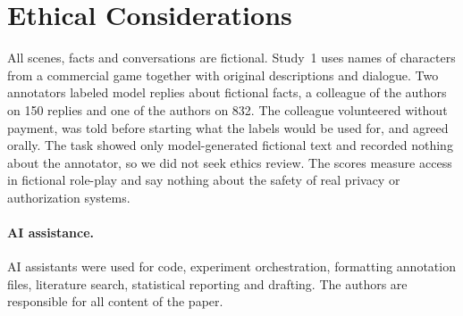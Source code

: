 \documentclass[11pt]{article}
\renewcommand{\topfraction}{0.9}\renewcommand{\bottomfraction}{0.6}\renewcommand{\textfraction}{0.08}
\renewcommand{\floatpagefraction}{0.75}\renewcommand{\dbltopfraction}{0.9}\renewcommand{\dblfloatpagefraction}{0.75}
\begin{document}
\section*{Ethical Considerations}
All scenes, facts and conversations are fictional. Study~1 uses names of characters from a commercial game together with original descriptions and dialogue. Two annotators labeled model replies about fictional facts, a colleague of the authors on 150 replies and one of the authors on 832. The colleague volunteered without payment, was told before starting what the labels would be used for, and agreed orally. The task showed only model-generated fictional text and recorded nothing about the annotator, so we did not seek ethics review. The scores measure access in fictional role-play and say nothing about the safety of real privacy or authorization systems.
\paragraph{AI assistance.} AI assistants were used for code, experiment orchestration, formatting annotation files, literature search, statistical reporting and drafting. The authors are responsible for all content of the paper.



\appendix
\raggedbottom
\setcounter{topnumber}{4}\setcounter{bottomnumber}{3}\setcounter{totalnumber}{6}\setcounter{dbltopnumber}{4}
\renewcommand{\topfraction}{0.95}\renewcommand{\bottomfraction}{0.9}\renewcommand{\textfraction}{0.05}\renewcommand{\floatpagefraction}{0.6}
\renewcommand{\dbltopfraction}{0.95}\renewcommand{\dblfloatpagefraction}{0.6}
\makeatletter\setlength{\@fptop}{0pt}\setlength{\@fpsep}{10pt}\setlength{\@fpbot}{0pt plus 1fil}\setlength{\@dblfptop}{0pt}\setlength{\@dblfpsep}{14pt}\setlength{\@dblfpbot}{0pt plus 1fil}\makeatother
\end{document}
